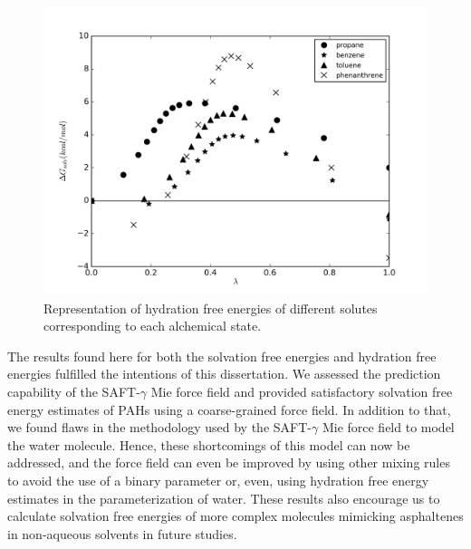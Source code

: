 \documentclass[final,12p,times,twocolumn]{elsarticle}
\begin{document}
	\begin{figure}
		\centering
		\includegraphics[width=1.0\linewidth]{Figures/waterart}
	\caption{Representation of hydration free energies of different solutes corresponding to each alchemical state.}
	\label{fig:water}
    \end{figure}

The results found here for both the solvation free energies and hydration free energies fulfilled the intentions of this dissertation. We assessed the prediction capability of the SAFT-$\gamma$ Mie force field and provided satisfactory solvation free energy estimates of PAHs using a coarse-grained force field. In addition to that, we found flaws in the methodology used by the SAFT-$\gamma$ Mie force field to model the water molecule. Hence, these shortcomings of this model can now be addressed, and the force field can even be improved by using other mixing rules to avoid the use of a binary parameter or, even, using hydration free energy estimates in the parameterization of water. These results also encourage us to calculate solvation free energies of more complex molecules mimicking asphaltenes in non-aqueous solvents in future studies.  
	
\end{document}
